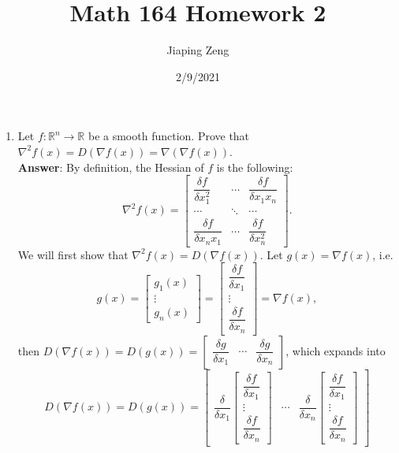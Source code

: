 \documentclass{article}
\title{Math 164 Homework 2}
\date{2/9/2021}
\author{Jiaping Zeng}
\begin{document}
\maketitle

\begin{enumerate}
    \item Let $f:\mathbb{R}^n\rightarrow\mathbb{R}$ be a smooth function. Prove that $\nabla^2f(x)=D(\nabla f(x))=\nabla(\nabla f(x))$.\\
          \textbf{Answer}: By definition, the Hessian of $f$ is the following:
          \[
              \nabla^2 f(x)=\begin{bmatrix}
                  \dfrac{\delta f}{\delta x_1^2}  & \cdots & \dfrac{\delta f}{\delta x_1x_n} \\
                  \cdots                          & \ddots & \cdots                          \\
                  \dfrac{\delta f}{\delta x_nx_1} & \cdots & \dfrac{\delta f}{\delta x_n^2}
              \end{bmatrix}.
          \] We will first show that $\nabla^2 f(x)=D(\nabla f(x))$. Let $g(x)=\nabla f(x)$, i.e. \[
              g(x)=\begin{bmatrix}
                  g_1(x) \\\vdots\\g_n(x)
              \end{bmatrix}=\begin{bmatrix}
                  \dfrac{\delta f}{\delta x_1} \\\vdots\\\dfrac{\delta f}{\delta x_n}
              \end{bmatrix}=\nabla f(x),
          \] then $D(\nabla f(x))=D(g(x))=\begin{bmatrix}
                  \dfrac{\delta g}{\delta x_1} & \cdots & \dfrac{\delta g}{\delta x_n}
              \end{bmatrix}$, which expands into \[
              D(\nabla f(x))=D(g(x))=\begin{bmatrix}
                  \dfrac{\delta}{\delta x_1}\begin{bmatrix}
                      \dfrac{\delta f}{\delta x_1} \\\vdots\\\dfrac{\delta f}{\delta x_n}
                  \end{bmatrix} & \cdots & \dfrac{\delta}{\delta x_n}\begin{bmatrix}
                      \dfrac{\delta f}{\delta x_1} \\\vdots\\\dfrac{\delta f}{\delta x_n}

\end{bmatrix}
\end{bmatrix}\]
\end{enumerate}
\end{document}
